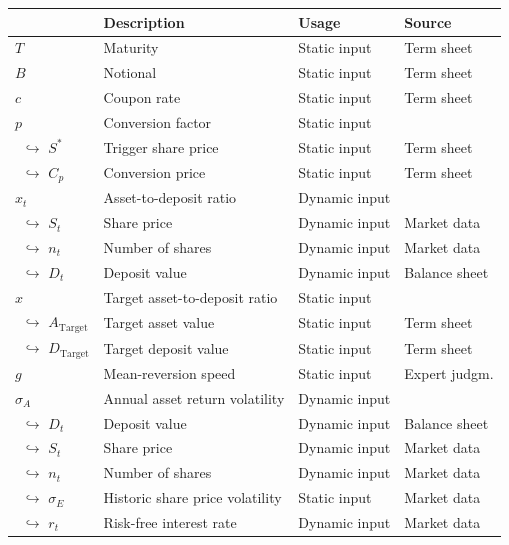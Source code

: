 \begin{table}
	\setlength{\extrarowheight}{2.5pt}
	\centering
	\footnotesize
	\begin{tabular}{p{1.8cm}p{6.8cm}p{2.4cm}p{2.5cm}}
		\toprule
			 & \textbf{Description} & \textbf{Usage} & \textbf{Source} \\
		\midrule
			$T$ & Maturity & Static input & Term sheet\\
			$B$ & Notional & Static input & Term sheet \\
			$c$ & Coupon rate & Static input & Term sheet\\ 
			$p$ & Conversion factor & Static input & \\
			$\,\,\,$$\hookrightarrow$ $S^*$ & Trigger share price & Static input & Term sheet\\
			$\,\,\,$$\hookrightarrow$ $C_p$ & Conversion price & Static input & Term sheet\\
			$x_t$ & Asset-to-deposit ratio & Dynamic input & \\
			$\,\,\,$$\hookrightarrow$ $S_t$ & Share price & Dynamic input & Market data\\
			$\,\,\,$$\hookrightarrow$ $n_t$ & Number of shares & Dynamic input & Market data\\
			$\,\,\,$$\hookrightarrow$ $D_t$ & Deposit value & Dynamic input & Balance sheet\\
			$\hat{x}$ & Target asset-to-deposit ratio & Static input & \\
			$\,\,\,$$\hookrightarrow$ $A_\text{Target}$ & Target asset value & Static input & Term sheet \\
			$\,\,\,$$\hookrightarrow$ $D_\text{Target}$ & Target deposit value & Static input & Term sheet\\
			$g$ & Mean-reversion speed & Static input & Expert judgm.  \\
			$\sigma_A$ & Annual asset return volatility & Dynamic input & \\
			$\,\,\,$$\hookrightarrow$ $D_t$ & Deposit value & Dynamic input & Balance sheet\\
			$\,\,\,$$\hookrightarrow$ $S_t$ & Share price & Dynamic input & Market data\\
			$\,\,\,$$\hookrightarrow$ $n_t$ & Number of shares & Dynamic input & Market data\\
			$\,\,\,$$\hookrightarrow$ $\sigma_E$& Historic share price volatility & Static input & Market data\\
			$\,\,\,$$\hookrightarrow$ $r_t$ & Risk-free interest rate & Dynamic input & Market data \\

\end{tabular}
\end{table}
